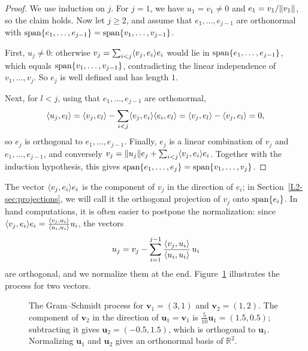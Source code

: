 \begin{proof}
    We use induction on $j$. For $j = 1$, we have $u_1 = v_1 \neq 0$ and $e_1 = v_1 / \lVert v_1 \rVert$, so the claim holds. Now let $j \geq 2$, and assume that $e_1, \ldots, e_{j-1}$ are orthonormal with $\operatorname{span}\{e_1, \ldots, e_{j-1}\} = \operatorname{span}\{v_1, \ldots, v_{j-1}\}$.

    First, $u_j \neq 0$: otherwise $v_j = \sum_{i < j} \langle v_j, e_i \rangle e_i$ would lie in $\operatorname{span}\{e_1, \ldots, e_{j-1}\}$, which equals $\operatorname{span}\{v_1, \ldots, v_{j-1}\}$, contradicting the linear independence of $v_1, \ldots, v_j$. So $e_j$ is well defined and has length $1$.

    Next, for $l < j$, using that $e_1, \ldots, e_{j-1}$ are orthonormal,
    \[\langle u_j, e_l \rangle = \langle v_j, e_l \rangle - \sum_{i < j} \langle v_j, e_i \rangle \langle e_i, e_l \rangle = \langle v_j, e_l \rangle - \langle v_j, e_l \rangle = 0,\]
    so $e_j$ is orthogonal to $e_1, \ldots, e_{j-1}$. Finally, $e_j$ is a linear combination of $v_j$ and $e_1, \ldots, e_{j-1}$, and conversely $v_j = \lVert u_j \rVert e_j + \sum_{i < j} \langle v_j, e_i \rangle e_i$. Together with the induction hypothesis, this gives $\operatorname{span}\{e_1, \ldots, e_j\} = \operatorname{span}\{v_1, \ldots, v_j\}$.
\end{proof}

The vector $\langle v_j, e_i \rangle e_i$ is the component of $v_j$ in the direction of $e_i$; in Section~\ref{L2-sec:projections}, we will call it the orthogonal projection of $v_j$ onto $\operatorname{span}\{e_i\}$. In hand computations, it is often easier to postpone the normalization: since $\langle v_j, e_i \rangle e_i = \frac{\langle v_j, u_i \rangle}{\langle u_i, u_i \rangle} u_i$, the vectors
\[u_j = v_j - \sum_{i=1}^{j-1} \frac{\langle v_j, u_i \rangle}{\langle u_i, u_i \rangle}\, u_i\]
are orthogonal, and we normalize them at the end. Figure~\ref{L2-fig:gram-schmidt} illustrates the process for two vectors.

\begin{figure}[ht]
    \centering
    \caption[The Gram--Schmidt process]{The Gram--Schmidt process for $\mathbf{v}_1 = (3, 1)$ and $\mathbf{v}_2 = (1, 2)$. The component of $\mathbf{v}_2$ in the direction of $\mathbf{u}_1 = \mathbf{v}_1$ is $\frac{5}{10} \mathbf{u}_1 = (1.5, 0.5)$; subtracting it gives $\mathbf{u}_2 = (-0.5, 1.5)$, which is orthogonal to $\mathbf{u}_1$. Normalizing $\mathbf{u}_1$ and $\mathbf{u}_2$ gives an orthonormal basis of $\mathbb{R}^2$.}
    \label{L2-fig:gram-schmidt}
\end{figure}

